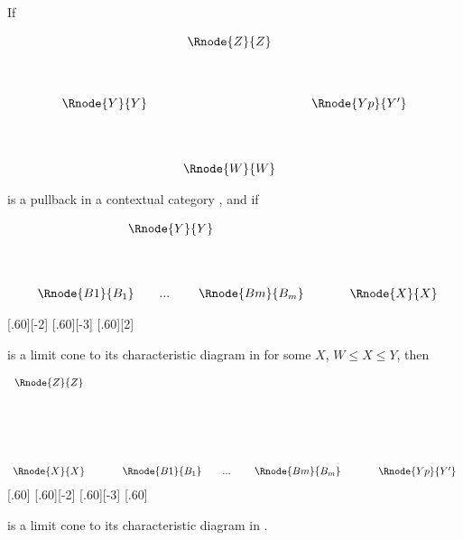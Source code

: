 \documentclass[10pt,a4paper]{scrartcl}
\newcommand{\ccatc}{contextual category \ccat}
\begin{document}
\begin{lemma}
If 

\begin{center}
\begin{equation}
\label{pbdrilldownpullback}
\begin{array}{cp{0.3cm}c    p{0.3cm}  c }
               & & \Rnode{Z}{Z} & &                                  \\ [1.3cm]
\Rnode{Y}{Y}   &&                               & & \Rnode{Yp}{Y'}   \\ [1.4cm]
               & & \Rnode{W}{W} & &   
\end{array}
\end{equation}
\end{center}

is a pullback in a \ccatc,
and if 
\begin{center}
\begin{displaymath}
\begin{array}{c p{0.4cm} c  }
\Rnode{Y}{Y} &&   \\ [1.4cm]
\begin{array}{cp{0cm}c   p{0.1cm}     c  }					
                             \Rnode{B1}{B_1}&   & ... & & \Rnode{Bm}{B_m}
	                      \end{array} 
	 && \Rnode{X}{X}                                              
\end{array} 
\end{displaymath}

[.60][-2]
[.60][-3]
[.60][2]
\end{center}
is a limit cone to its characteristic diagram in \ccat  for some $X$, $W \leq X \leq Y$, then  
\begin{center}
\begin{equation}
\label{pbdrilldowncone}
\begin{array}{c p{0.4cm} c p{0.4cm} c }
\Rnode{Z}{Z} && &&      \\ [2.6cm]
\Rnode{X}{X}&& \begin{array}{cp{0cm}c   p{0.1cm}     c  }					
                             \Rnode{B1}{B_1}&   & ... & & \Rnode{Bm}{B_m}
	                      \end{array} 
	 && \Rnode{Yp}{Y'}                                              
\end{array} 
\end{equation}
[.60]
[.60][-2]
[.60][-3]
[.60]
\end{center}
is a limit cone to its characteristic diagram in \ccat.
\end{lemma}
\end{document}
